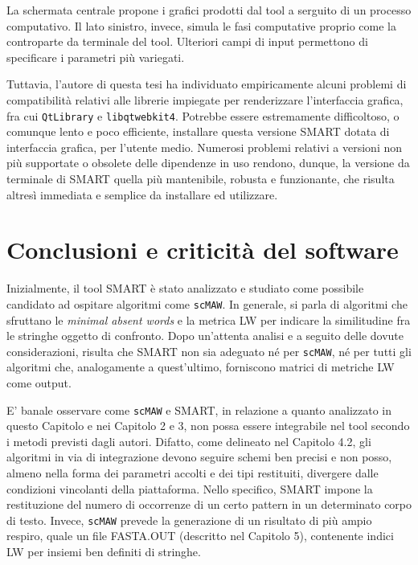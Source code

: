 La schermata centrale propone i grafici prodotti dal tool a serguito di un processo computativo. Il lato sinistro, invece, simula le fasi computative proprio come la controparte da terminale del tool. Ulteriori campi di input permettono di specificare i parametri più variegati.

\vspace{3mm}

Tuttavia, l'autore di questa tesi ha individuato empiricamente alcuni problemi di compatibilità relativi alle librerie impiegate per renderizzare l'interfaccia grafica, fra cui \verb|QtLibrary| e \verb|libqtwebkit4|. Potrebbe essere estremamente difficoltoso, o comunque lento e poco efficiente, installare questa versione SMART dotata di interfaccia grafica, per l'utente medio. Numerosi problemi relativi a versioni non più supportate o obsolete delle dipendenze in uso rendono, dunque, la versione da terminale di SMART quella più mantenibile, robusta e funzionante, che risulta altresì immediata e semplice da installare ed utilizzare.

\section{Conclusioni e criticità del software}

Inizialmente, il tool SMART è stato analizzato e studiato come possibile candidato ad ospitare algoritmi come \verb|scMAW|. In generale, si parla di algoritmi che sfruttano le \textit{minimal absent words} e la metrica LW per indicare la similitudine fra le stringhe oggetto di confronto. Dopo un'attenta analisi e a seguito delle dovute considerazioni, risulta che SMART non sia adeguato né per \verb|scMAW|, né per tutti gli algoritmi che, analogamente a quest'ultimo, forniscono matrici di metriche LW come output. 

E' banale osservare come \verb|scMAW| e SMART, in relazione a quanto analizzato in questo Capitolo e nei Capitolo 2 e 3, non possa essere integrabile nel tool secondo i metodi previsti dagli autori. Difatto, come delineato nel Capitolo 4.2, gli algoritmi in via di integrazione devono seguire schemi ben precisi e non posso, almeno nella forma dei parametri accolti e dei tipi restituiti, divergere dalle condizioni vincolanti della piattaforma. Nello specifico, SMART impone la restituzione del numero di occorrenze di un certo pattern in un determinato corpo di testo. Invece, \verb|scMAW| prevede la generazione di un risultato di più ampio respiro, quale un file FASTA.OUT (descritto nel Capitolo 5), contenente indici LW per insiemi ben definiti di stringhe.

